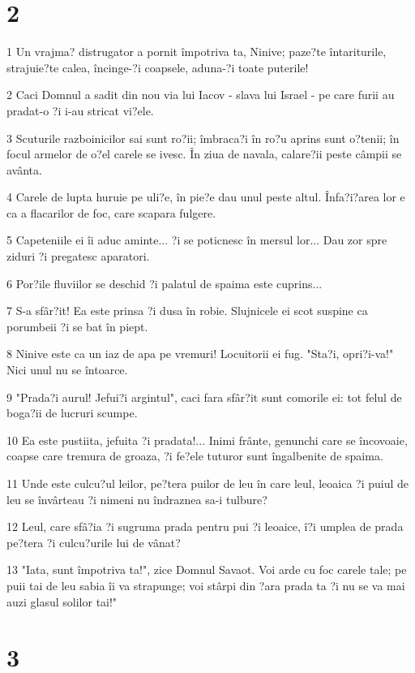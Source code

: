 \chapter{2}

\par 1 Un vrajma? distrugator a pornit împotriva ta, Ninive; paze?te întariturile, strajuie?te calea, încinge-?i coapsele, aduna-?i toate puterile!
\par 2 Caci Domnul a sadit din nou via lui Iacov - slava lui Israel - pe care furii au pradat-o ?i i-au stricat vi?ele.
\par 3 Scuturile razboinicilor sai sunt ro?ii; îmbraca?i în ro?u aprins sunt o?tenii; în focul armelor de o?el carele se ivesc. În ziua de navala, calare?ii peste câmpii se avânta.
\par 4 Carele de lupta huruie pe uli?e, în pie?e dau unul peste altul. Înfa?i?area lor e ca a flacarilor de foc, care scapara fulgere.
\par 5 Capeteniile ei îi aduc aminte... ?i se poticnesc în mersul lor... Dau zor spre ziduri ?i pregatesc aparatori.
\par 6 Por?ile fluviilor se deschid ?i palatul de spaima este cuprins...
\par 7 S-a sfâr?it! Ea este prinsa ?i dusa în robie. Slujnicele ei scot suspine ca porumbeii ?i se bat în piept.
\par 8 Ninive este ca un iaz de apa pe vremuri! Locuitorii ei fug. "Sta?i, opri?i-va!" Nici unul nu se întoarce.
\par 9 "Prada?i aurul! Jefui?i argintul", caci fara sfâr?it sunt comorile ei: tot felul de boga?ii de lucruri scumpe.
\par 10 Ea este pustiita, jefuita ?i pradata!... Inimi frânte, genunchi care se încovoaie, coapse care tremura de groaza, ?i fe?ele tuturor sunt îngalbenite de spaima.
\par 11 Unde este culcu?ul leilor, pe?tera puilor de leu în care leul, leoaica ?i puiul de leu se învârteau ?i nimeni nu îndraznea sa-i tulbure?
\par 12 Leul, care sfâ?ia ?i sugruma prada pentru pui ?i leoaice, î?i umplea de prada pe?tera ?i culcu?urile lui de vânat?
\par 13 "Iata, sunt împotriva ta!", zice Domnul Savaot. Voi arde cu foc carele tale; pe puii tai de leu sabia îi va strapunge; voi stârpi din ?ara prada ta ?i nu se va mai auzi glasul solilor tai!"

\chapter{3}

